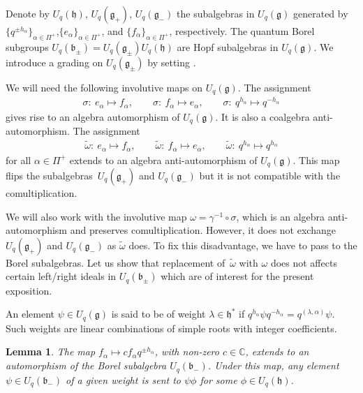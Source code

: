 \documentclass[pdftex]{sigma}
\numberwithin{equation}{section}
\newtheorem{Lemma}[Theorem]{Lemma}
\begin{document}
Denote by $U_q(\mathfrak{h})$, $U_q(\mathfrak{g}_+)$, $U_q(\mathfrak{g}_-)$ the subalgebras in $U_q(\mathfrak{g})$ generated by $\big\{q^{\pm h_\alpha}\big\}_{\alpha\in \Pi^+}$,\linebreak $\{e_\alpha\}_{\alpha\in \Pi^+}$, and $\{f_\alpha\}_{\alpha\in \Pi^+}$, respectively. The quantum Borel subgroups $U_q(\mathfrak{b}_\pm)=U_q(\mathfrak{g}_\pm)U_q(\mathfrak{h})$ are Hopf subalgebras in $U_q\!(\mathfrak{g})$. We introduce a grading on $U_q\!(\mathfrak{g}_\pm\!)$ by setting .

We will need the following involutive maps on $U_q(\mathfrak{g})$.
The assignment
\begin{gather*}
\sigma\colon \ e_\alpha\mapsto f_\alpha, \qquad\sigma\colon \ f_\alpha\mapsto e_\alpha, \qquad \sigma\colon \ q^{h_\alpha}\mapsto q^{-h_\alpha}
\end{gather*}
gives rise to an algebra automorphism of $U_q(\mathfrak{g})$. It is also a coalgebra anti-automorphism. The assignment
\begin{gather*}
\tilde \omega\colon \ e_\alpha\mapsto f_\alpha, \qquad\tilde \omega\colon \ f_\alpha\mapsto e_\alpha, \qquad \tilde \omega\colon \ q^{h_\alpha}\mapsto q^{h_\alpha}
\end{gather*}
for all $\alpha \in \Pi^+$ extends to an algebra anti-automorphism of $U_q(\mathfrak{g})$. This map flips the subalgebras~$U_q(\mathfrak{g}_+)$ and $U_q(\mathfrak{g}_-)$ but it is not compatible with the comultiplication.

We will also work with the involutive map $\omega =\gamma^{-1}\circ \sigma$, which is an algebra anti-automorphism and preserves comultiplication. However, it does not exchange $U_q(\mathfrak{g}_+)$ and $U_q(\mathfrak{g}_-)$ as $\tilde \omega$ does. To fix this disadvantage, we have to pass to the Borel subalgebras. Let us show that replacement of~$\tilde \omega$ with $\omega$ does not affects certain left/right ideals in $U_q(\mathfrak{b}_\pm)$ which are of interest for the present exposition.

An element $\psi\in U_q(\mathfrak{g})$ is said to be of weight $\lambda\in \mathfrak{h}^*$ if $q^{h_\alpha}\psi q^{-h_\alpha}=q^{(\lambda,\alpha)}\psi$. Such weights are linear combinations of simple roots with integer coefficients.

\begin{Lemma}\label{eq-ideals} The map $f_{\alpha}\mapsto c f_{\alpha}q^{\pm h_\alpha}$, with non-zero $c\in \mathbb{C}$, extends to an automorphism of the Borel subalgebra $U_q(\mathfrak{b}_-)$. Under this map, any element $\psi\in U_q(\mathfrak{b}_-)$ of a given weight is sent to $\psi \phi$ for some $\phi\in U_q(\mathfrak{h})$.
\end{Lemma}
\end{document}
